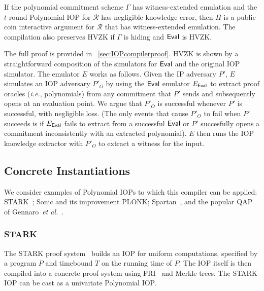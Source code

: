 \begin{theorem}\label{thm:IOPcompiler}
If the polynomial commitment scheme $\Gamma$ has witness-extended emulation and the $t$-round Polynomial IOP for $\mathcal{R}$ has negligible knowledge error, then $\Pi$ is a public-coin interactive argument for $\mathcal{R}$ that has witness-extended emulation. The compilation also preserves HVZK if $\Gamma$ is hiding and $\textsf{{Eval}}$ is HVZK. 
\end{theorem}

The full proof is provided in \appendixphrase~\ref{sec:IOPcompilerproof}. 
HVZK is shown by a straightforward composition of the simulators for $\textsf{{Eval}}$ and the original IOP simulator. The emulator $E$ works as follows. Given the IP adversary $P'$, $E$ simulates an IOP adversary $P'_O$ by using the $\textsf{{Eval}}$ emulator $E_\textsf{{Eval}}$ to extract proof oracles (\emph{i.e.}, polynomials) from any commitment that $P'$ sends and subsequently opens at an evaluation point. We argue that $P'_O$ is successful whenever $P'$ is successful, with negligible loss. (The only events that cause $P'_O$ to fail when $P'$ succeeds is if $E_\textsf{{Eval}}$ fails to extract from a successful $\textsf{{Eval}}$ or $P'$ succesfully opens a commitment inconsistently with an extracted polynomial). $E$ then runs the IOP knowledge extractor with $P'_O$ to extract a witness for the input. 


\subsection{Concrete Instantiations} 

We consider examples of Polynomial IOPs to which this compiler can be applied: \textsf{STARK}~\cite{C:BBHR19}; \textsf{Sonic} and its improvement \textsf{PLONK}; \textsf{Spartan}~\cite{Spartan}, and the popular QAP of Gennaro~\emph{et al.}~\cite{EC:GGPR13}. 

\subsubsection{STARK}
The \textsf{STARK} proof system~\cite{C:BBHR19} builds an IOP for uniform computations, specified by a program $P$ and timebound $T$ on the running time of $P$. %
The IOP itself is then compiled into a concrete proof system using FRI~\cite{ICALP:BBHR18} and Merkle trees.
The \textsf{STARK} IOP can be cast as a univariate Polynomial IOP. 

